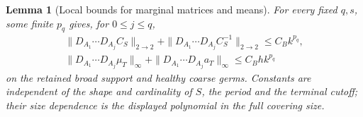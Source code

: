 \documentclass[11pt,reqno]{amsart}
\numberwithin{equation}{section}
\newtheorem{lemma}[theorem]{Lemma}
\theoremstyle{definition}
\theoremstyle{remark}
\begin{document}
\begin{lemma}[Local bounds for marginal matrices and means]
\label{lem:output-selected-data}
For every fixed \(q,s\), some finite \(p_q\) gives, for
\(0\le j\le q\),
\begin{gather}
 \|D_{A_1}\cdots D_{A_j}C_S\|_{2\to2}
       +\|D_{A_1}\cdots D_{A_j}C_S^{-1}\|_{2\to2}
                                               \le C_Bk^{p_q},
 \label{eq:output-marginal-matrix-jets}\\
 \|D_{A_1}\cdots D_{A_j}\mu_T\|_\infty
       +\|D_{A_1}\cdots D_{A_j}a_T\|_\infty
                                               \le C_Bh k^{p_q}
 \label{eq:output-mean-chart-jets}
\end{gather}
on the retained broad support and healthy coarse germs.
Constants are independent of the shape and cardinality of
\(S\), the period and the terminal cutoff; their size dependence
is the displayed polynomial in the full covering size.
\end{lemma}
\end{document}
